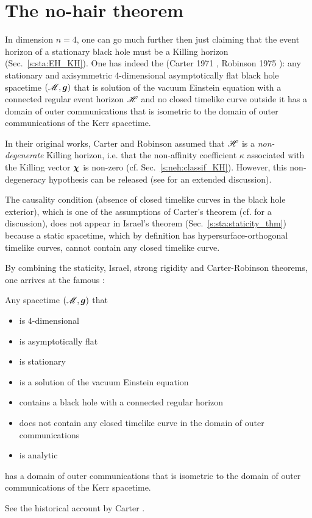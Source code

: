 
\section{The no-hair theorem} \label{s:sta:no-hair}

In dimension $n=4$, one can go much further then just claiming that the
event horizon of a stationary black hole must be a Killing horizon (Sec.~\ref{s:sta:EH_KH}).
One has indeed the 
(Carter 1971 \cite{Carte71}, Robinson 1975 \cite{Robin75}):
any stationary and axisymmetric 4-dimensional asymptotically flat
black hole spacetime $(\mathscr{M},\bm{g})$ that is
solution of the vacuum Einstein equation with a connected regular
event horizon $\mathscr{H}$ and no closed timelike curve outside it
has a domain of outer communications that is isometric
to the domain of outer communications of the Kerr spacetime.

\begin{remark}
In their original works, Carter and Robinson assumed that $\mathscr{H}$ is a
\emph{non-degenerate}
Killing horizon, i.e. that the non-affinity coefficient $\kappa$ associated
with the Killing vector $\bm{\chi}$ is non-zero (cf. Sec.~\ref{s:neh:classif_KH}). However, this non-degeneracy
hypothesis can be released \cite{ChrusN10} (see \cite{ChrusLH12} for an
extended discussion).
\end{remark}

\begin{remark}
The causality condition (absence of closed timelike curves in the black
hole exterior), which is one of the assumptions of Carter's theorem
(cf. \cite{Carte99} for a discussion), does not appear in Israel's theorem
(Sec.~\ref{s:sta:staticity_thm}) because a static spacetime, which by definition
has hypersurface-orthogonal timelike curves,
cannot contain any closed timelike curve.
\end{remark}

By combining the staticity, Israel, strong rigidity and Carter-Robinson theorems,
one arrives at the famous :
\begin{greybox}
Any spacetime $(\mathscr{M},\bm{g})$ that
\begin{itemize}
\item is 4-dimensional
\item is asymptotically flat
\item is stationary
\item is a solution of the vacuum Einstein equation
\item contains a black hole with a connected regular horizon
\item does not contain any closed timelike curve in the domain of outer
communications
\item is analytic
\end{itemize}
has a domain of outer communications that is isometric
to the domain of outer communications of the Kerr spacetime.
\end{greybox}

\begin{hist}
See the historical account by Carter \cite{Carte99}.
\end{hist}
